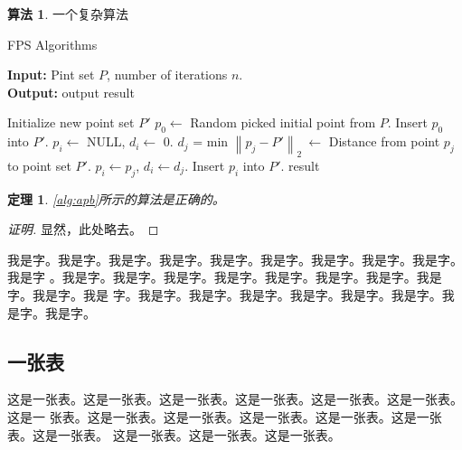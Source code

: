\documentclass[supercite]{HustMasterReport}
\newcommand{\ralg}[1]{\autoref{alg:#1}}
\newtheorem{thm}{定理}[section]
\theoremstyle{definition}
\newtheorem{alg}{算法}[section]
\begin{document}
\begin{alg}{一个复杂算法}
  \label{alg:apb}
    \begin{algorithm}
            \caption{FPS Algorithms}
            \hspace*{0.02in} {\bf Input:} %
                Pint set $P$, number of iterations $n$.\\
            \hspace*{0.02in} {\bf Output:} %
                output result
            \begin{spacing}{1.0}
        	\begin{algorithmic}
        		\State Initialize new point set $P'$
        		\State $p_0 \leftarrow$ Random picked initial point from $P$.
        		\State Insert $p_0$ into $P'$.
        		\State $p_i \leftarrow$ NULL, $d_i \leftarrow$ 0.
        		\State $d_j$ = min $\left\|p_j - P'\right\|_2\ \leftarrow$ Distance from point $p_j$ to point set $P'$.
        		\State $p_i \leftarrow p_j$, $d_i \leftarrow d_j$.
        	    \EndIf
        	    \EndFor
        	    \State Insert $p_i$ into $P'$.
        	    \EndFor
        		\State \Return result
        	\end{algorithmic}
                \end{spacing}
    \end{algorithm}
\end{alg}

\begin{thm} \label{thm:gsb-apprx}
  \ralg{apb}所示的算法是正确的。
\end{thm}
\begin{proof}[证明]
  显然，此处略去。
\end{proof}

我是字。我是字。我是字。我是字。我是字。我是字。我是字。我是字。我是字。我是字
。我是字。我是字。我是字。我是字。我是字。我是字。我是字。我是字。我是字。我是
字。我是字。我是字。我是字。我是字。我是字。我是字。我是字。我是字。

\subsection{一张表}

这是一张表。这是一张表。这是一张表。这是一张表。这是一张表。这是一张表。这是一
张表。这是一张表。这是一张表。这是一张表。这是一张表。这是一张表。这是一张表。
这是一张表。这是一张表。这是一张表。
\end{document}
